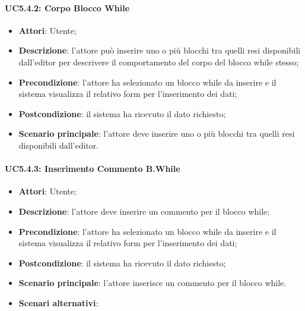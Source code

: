 \paragraph{UC5.4.2: Corpo Blocco While}
\label{UC5.4.2}
\begin{itemize}
\item \textbf{Attori}: Utente;
\item \textbf{Descrizione}: l'attore può inserire uno o più blocchi tra quelli resi disponibili dall'editor per descrivere il comportamento del corpo del blocco while stesso;	
\item \textbf{Precondizione}: l'attore ha selezionato un blocco while da inserire e il sistema visualizza il relativo form per l'inserimento dei dati;	
\item \textbf{Postcondizione}: il sistema ha ricevuto il dato richiesto;	
\item \textbf{Scenario principale}:
l'attore deve inserire uno o più blocchi tra quelli resi disponibili dall'editor.	
\end{itemize}

\paragraph{UC5.4.3: Inserimento Commento B.While	}
\label{UC5.4.3}
\begin{itemize}
\item \textbf{Attori}: Utente;
\item \textbf{Descrizione}: l'attore deve inserire un commento per il blocco while;	
\item \textbf{Precondizione}: l'attore ha selezionato un blocco while da inserire e il sistema visualizza il relativo form per l'inserimento dei dati;	
\item \textbf{Postcondizione}: il sistema ha ricevuto il dato richiesto;	
\item \textbf{Scenario principale}:
l'attore inserisce un commento per il blocco while.
\item \textbf{Scenari alternativi}:
	

\end{itemize}

